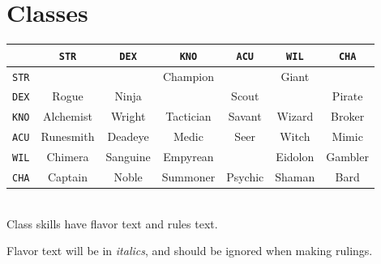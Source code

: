 \documentclass[12pt]{article}
\newcommand{\STR}{\texttt{STR}}
\newcommand{\DEX}{\texttt{DEX}}
\newcommand{\KNO}{\texttt{KNO}}
\newcommand{\ACU}{\texttt{ACU}}
\newcommand{\WIL}{\texttt{WIL}}
\newcommand{\CHA}{\texttt{CHA}}
\begin{document}
\pagebreak
\section{Classes}

\begin{tabularx}{\textwidth}{c|CCCCCC}
& \STR & \DEX & \KNO & \ACU & \WIL & \CHA \\\hline
\STR &  &  & Champion &  & Giant &  \\
\DEX & Rogue & Ninja &  & Scout & & Pirate \\
\KNO & Alchemist & Wright & Tactician & Savant & Wizard & Broker \\
\ACU & Runesmith & Deadeye & Medic & Seer & Witch & Mimic  \\
\WIL & Chimera & Sanguine & Empyrean &  & Eidolon & Gambler \\
\CHA & Captain & Noble & Summoner & Psychic & Shaman & Bard \\
\end{tabularx}
\\[5mm]
Class skills have flavor text and rules text.

Flavor text will be in \textit{italics}, and should be ignored when making rulings.
\end{document}
